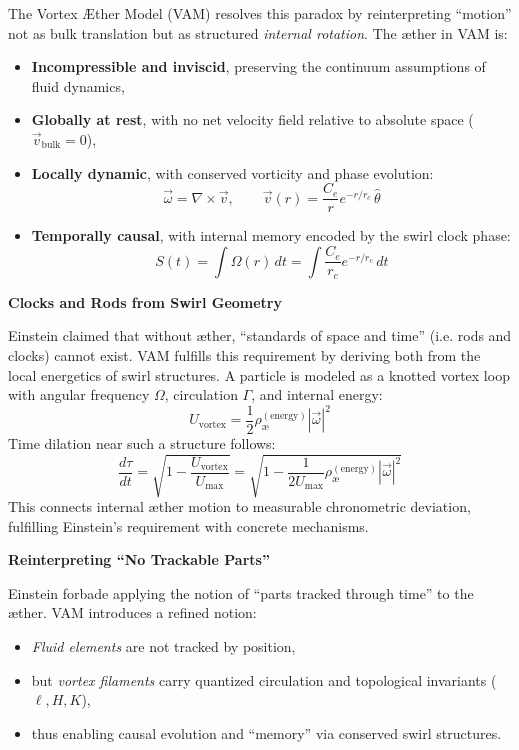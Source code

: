 \documentclass[preprint,notitlepage]{revtex4-2}
\begin{document}
    The Vortex Æther Model (VAM) resolves this paradox by reinterpreting “motion” not as bulk translation but as structured \emph{internal rotation}. The æther in VAM is:
    \begin{itemize}
        \item \textbf{Incompressible and inviscid}, preserving the continuum assumptions of fluid dynamics,
        \item \textbf{Globally at rest}, with no net velocity field relative to absolute space (\( \vec{v}_{\text{bulk}} = 0 \)),
        \item \textbf{Locally dynamic}, with conserved vorticity and phase evolution:
        \[
            \vec{\omega} = \nabla \times \vec{v}, \qquad \vec{v}(r) = \frac{C_e}{r} e^{-r/r_c} \, \hat{\theta}
        \]
        \item \textbf{Temporally causal}, with internal memory encoded by the swirl clock phase:
        \[
            S(t) = \int \Omega(r) \, dt = \int \frac{C_e}{r_c} e^{-r/r_c} \, dt
        \]
    \end{itemize}

    \vspace{0.5em}
    \noindent
    \textbf{Clocks and Rods from Swirl Geometry}

    Einstein claimed that without æther, “standards of space and time” (i.e. rods and clocks) cannot exist. VAM fulfills this requirement by deriving both from the local energetics of swirl structures. A particle is modeled as a knotted vortex loop with angular frequency \( \Omega \), circulation \( \Gamma \), and internal energy:
    \[
        U_{\text{vortex}} = \frac{1}{2} \rho_\text{\ae}^{(\text{energy})} |\vec{\omega}|^2
    \]
    Time dilation near such a structure follows:
    \[
        \frac{d\tau}{dt} = \sqrt{1 - \frac{U_{\text{vortex}}}{U_{\text{max}}}} = \sqrt{1 - \frac{1}{2U_{\text{max}}} \rho_\text{\ae}^{(\text{energy})} |\vec{\omega}|^2}
    \]
    This connects internal æther motion to measurable chronometric deviation, fulfilling Einstein's requirement with concrete mechanisms.

    \vspace{0.5em}
    \noindent
    \textbf{Reinterpreting “No Trackable Parts”}

    Einstein forbade applying the notion of “parts tracked through time” to the æther. VAM introduces a refined notion:
    \begin{itemize}
        \item \emph{Fluid elements} are not tracked by position,
        \item but \emph{vortex filaments} carry quantized circulation and topological invariants (\( \ell, H, K \)),
        \item thus enabling causal evolution and “memory” via conserved swirl structures.
    \end{itemize}
\end{document}
